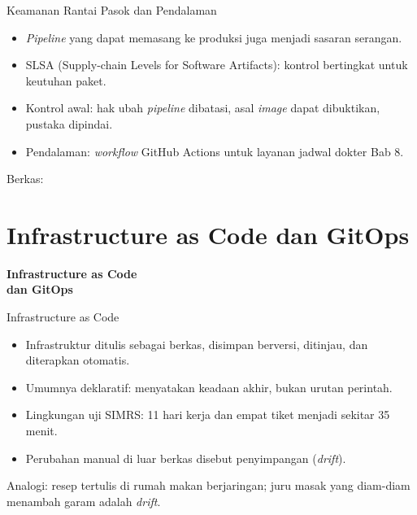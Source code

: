 \documentclass[aspectratio=169, table, 12pt]{beamer}
\begin{document}
\begin{frame}{{\Large Keamanan Rantai Pasok dan Pendalaman}}
  \vspace{10pt}
  \begin{itemize}
    \item \textit{Pipeline} yang dapat memasang ke produksi juga menjadi sasaran serangan.
    \item SLSA (Supply-chain Levels for Software Artifacts): kontrol bertingkat untuk keutuhan
          paket.
    \item Kontrol awal: hak ubah \textit{pipeline} dibatasi, asal \textit{image} dapat
          dibuktikan, pustaka dipindai.
    \item Pendalaman: \textit{workflow} GitHub Actions untuk layanan jadwal dokter Bab 8.
  \end{itemize}
  \vspace{6pt}
  {\small Berkas: }
\end{frame}

\section{Infrastructure as Code dan GitOps}

\begin{frame}{\hfill}
  \centering
  \Huge{\textbf{Infrastructure as Code\\dan GitOps}}
\end{frame}

\begin{frame}{{\Large Infrastructure as Code}}
  \vspace{10pt}
  \begin{itemize}
    \item Infrastruktur ditulis sebagai berkas, disimpan berversi, ditinjau, dan diterapkan
          otomatis.
    \item Umumnya deklaratif: menyatakan keadaan akhir, bukan urutan perintah.
    \item Lingkungan uji SIMRS: 11 hari kerja dan empat tiket menjadi sekitar 35 menit.
    \item Perubahan manual di luar berkas disebut penyimpangan (\textit{drift}).
  \end{itemize}
  \vspace{6pt}
  {\small Analogi: resep tertulis di rumah makan berjaringan; juru masak yang diam-diam menambah
  garam adalah \textit{drift}.}
\end{frame}
\end{document}
